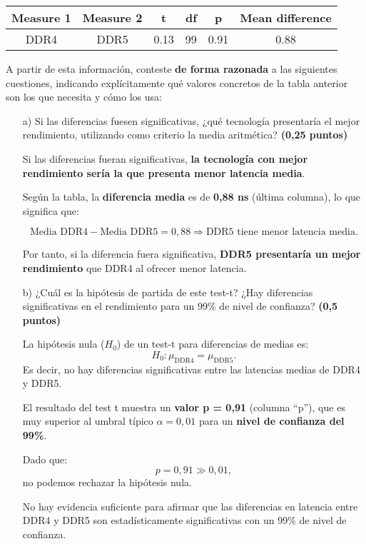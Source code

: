 \documentclass[a4paper,12pt]{article}
\begin{document}
\begin{center}
\begin{tabular}{|c|c|c|c|c|c|}
\hline
\textbf{Measure 1} & \textbf{Measure 2} & \textbf{t} & \textbf{df} & \textbf{p} & \textbf{Mean difference} \\
\hline
DDR4 & DDR5 & 0.13 & 99 & 0.91 & 0.88 \\
\hline
\end{tabular}
\end{center}

A partir de esta información, conteste \textbf{de forma razonada} a las siguientes cuestiones, indicando explícitamente qué valores concretos de la tabla anterior son los que necesita y cómo los usa:
\begin{enumerate}
    \item[a)] Si las diferencias fuesen significativas, ¿qué tecnología presentaría el mejor rendimiento, utilizando como criterio la media aritmética? \textbf{(0,25 puntos)}
    

    Si las diferencias fueran significativas, \textbf{la tecnología con mejor rendimiento sería la que presenta menor latencia media}. 

    Según la tabla, la \textbf{diferencia media} es de \textbf{0{,}88 ns} (última columna), lo que significa que:

    \[
    \text{Media DDR4} - \text{Media DDR5} = 0{,}88 \Rightarrow \text{DDR5 tiene menor latencia media}.
    \]

    Por tanto, si la diferencia fuera significativa, \textbf{DDR5 presentaría un mejor rendimiento} que DDR4 al ofrecer menor latencia.

    \item[b)] ¿Cuál es la hipótesis de partida de este test-t? ¿Hay diferencias significativas en el rendimiento para un 99\% de nivel de confianza? \textbf{(0,5 puntos)}
    
    La hipótesis nula ($H_0$) de un test-t para diferencias de medias es:
    \[
    H_0: \mu_{\text{DDR4}} = \mu_{\text{DDR5}}.
    \]
    Es decir, no hay diferencias significativas entre las latencias medias de DDR4 y DDR5.

    El resultado del test t muestra un \textbf{valor p = 0{,}91} (columna “p”), que es muy superior al umbral típico $\alpha = 0{,}01$ para un \textbf{nivel de confianza del 99\%}.

    Dado que:
    \[
    p = 0{,}91 \gg 0{,}01,
    \]
    no podemos rechazar la hipótesis nula.

    No hay evidencia suficiente para afirmar que las diferencias en latencia entre DDR4 y DDR5 son estadísticamente significativas con un 99\% de nivel de confianza.
\end{enumerate}
\end{document}
